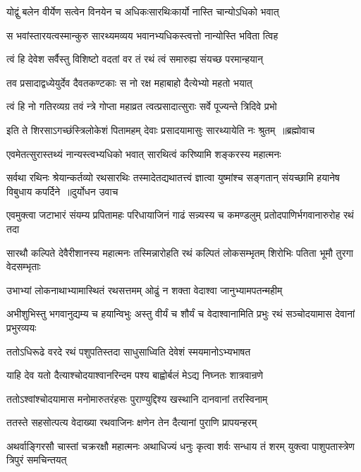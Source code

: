 \twolineshloka
{योद्वुं बलेन वीर्येण सत्वेन विनयेन च}
{अधिकःसारथिःकार्यो नास्ति चान्योऽधिको भवात्}


\twolineshloka
{स भवांस्तारयत्वस्मान्कुरु सारथ्यमव्यय}
{भवानभ्यधिकस्त्वत्तो नान्योस्ति भविता त्विह}


\twolineshloka
{त्वं हि देवेश सर्वैस्तु विशिष्टो वदतां वर}
{तं रथं त्वं समारुह्य संयच्छ परमान्हयान्}


\twolineshloka
{तव प्रसादाद्वध्येयुर्देव दैवतकण्टकाः}
{स नो रक्ष महाबाहो दैत्येभ्यो महतो भयात्}


\twolineshloka
{त्वं हि नो गतिरव्यग्र तवं न्त्रे गोप्ता महाव्रत}
{त्वत्प्रसादात्सुराः सर्वे पूज्यन्ते त्रिदिवे प्रभो}


\threelineshloka
{इति ते शिरसाऽगच्छंस्त्रिलोकेशं पितामहम्}
{देवाः प्रसादयामासुः सारथ्यायेति नः श्रुतम् ॥ब्रह्मोवाच}
{}


\twolineshloka
{एवमेतत्सुरास्तथ्यं नान्यस्त्वभ्यधिको भवात्}
{सारथित्वं करिष्यामि शङ्करस्य महात्मनः}


\fourlineindentedshloka
{सर्वथा रथिनः श्रेयान्कर्तव्यो रथसारथिः}
{तस्मादेतद्यथातत्त्वं ज्ञात्वा युष्मांश्च सङ्गतान्}
{संयच्छामि हयानेष विबुधाय कपर्दिने ॥दुर्योधन उवाच}
{}


\threelineshloka
{एवमुक्त्वा जटाभारं संयम्य प्रपितामहः}
{परिधायाजिनं गाढं सन्न्यस्य च कमण्डलुम्}
{प्रतोदपाणिर्भगवानारुरोह रथं तदा}


\threelineshloka
{सारथौ कल्पिते देवैरीशानस्य महात्मनः}
{तस्मिन्नारोहति रथं कल्पितं लोकसम्भृतम्}
{शिरोभिः पतिता भूमौ तुरगा वेदसम्भृताः}


\twolineshloka
{उभाभ्यां लोकनाथाभ्यामास्थितं रथसत्तमम्}
{ओढुं न शक्ता वेदाश्वा जानुभ्यामपतन्महीम्}


\threelineshloka
{अभीशुभिस्तु भगवानुद्यम्य च हयान्विभुः}
{अस्तु वीर्यं च शौर्यं च वेदाश्वानामिति प्रभुः}
{रथं सञ्चोदयामास देवानां प्रभुरव्ययः}


\twolineshloka
{ततोऽधिरूढे वरदे रथं पशुपतिस्तदा}
{साधुसाध्विति देवेशं स्मयमानोऽभ्यभाषत}


\twolineshloka
{याहि देव यतो दैत्याश्चोदयाश्वानरिन्दम}
{पश्य बाह्वोर्बलं मेऽद्य निघ्नतः शात्रवान्रणे}


\twolineshloka
{ततोऽश्वांश्चोदयामास मनोमारुतरंहसः}
{पुराण्युद्दिश्य खस्थानि दानवानां तरस्विनाम्}


\twolineshloka
{ततस्ते सहसोत्पत्य वेदाख्या रथवाजिनः}
{क्षणेन तेन दैत्यानां पुराणि प्रापयन्हरम्}


\threelineshloka
{अथर्वाङ्गिरसौ चास्तां चक्ररक्षौ महात्मनः}
{अथाधिज्यं धनुः कृत्वा शर्वः सन्धाय तं शरम्}
{युक्त्वा पाशुपतास्त्रेण त्रिपुरं समचिन्तयत्}


